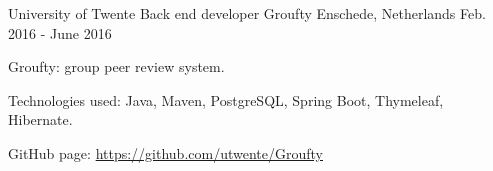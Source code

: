 \begin{cventries}
\cventry
{University of Twente} %
{Back end developer Groufty} %
{Enschede, Netherlands} %
{Feb. 2016 - June 2016} %
{
  \begin{cvitems}
	\item Groufty: group peer review system.
	\item Technologies used: Java, Maven, PostgreSQL, Spring Boot, Thymeleaf, Hibernate.
	\item GitHub page: \url{https://github.com/utwente/Groufty}
  \end{cvitems}
}


\end{cventries}
